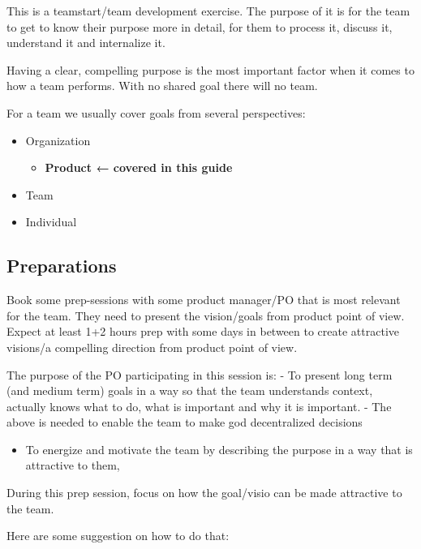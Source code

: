\documentclass[a4paper,,tablecaptionabove]{scrartcl}
\providecommand{\tightlist}{%
  \setlength{\itemsep}{0pt}\setlength{\parskip}{0pt}}
\begin{document}
This is a teamstart/team development exercise. The purpose of it is for
the team to get to know their purpose more in detail, for them to
process it, discuss it, understand it and internalize it.

Having a clear, compelling purpose is the most important factor when it
comes to how a team performs. With no shared goal there will no team.

For a team we usually cover goals from several perspectives:

\begin{itemize}
\item
  Organization

  \begin{itemize}
  \tightlist
  \item
    \textbf{Product ← covered in this guide}
  \end{itemize}
\item
  Team
\item
  Individual
\end{itemize}

\hypertarget{preparations}{%
\subsection*{Preparations}\label{preparations}}

Book some prep-sessions with some product manager/PO that is most
relevant for the team. They need to present the vision/goals from
product point of view. Expect at least 1+2 hours prep with some days in
between to create attractive visions/a compelling direction from product
point of view.

The purpose of the PO participating in this session is: - To present
long term (and medium term) goals in a way so that the team understands
context, actually knows what to do, what is important and why it is
important. - The above is needed to enable the team to make god
decentralized decisions

\begin{itemize}
\tightlist
\item
  To energize and motivate the team by describing the purpose in a way
  that is attractive to them,
\end{itemize}

During this prep session, focus on how the goal/visio can be made
attractive to the team.

Here are some suggestion on how to do that:
\end{document}
